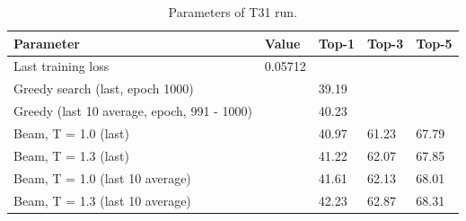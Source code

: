 \documentclass{article}
\begin{document}
\begin{table}[h!]
\caption{Parameters of T31 run.}
  \centering
  \begin{tabular}{p{8.2cm}p{1.5cm}p{1.5cm}p{1.5cm}p{1.5cm}}
    \toprule
    Parameter & Value & Top-1 & Top-3 & Top-5 \\
    \midrule
    Last training loss & 0.05712 & & & \\
    \midrule
    Greedy search (last, epoch 1000) & & 39.19 & & \\
    Greedy (last 10 average, epoch, 991 - 1000) & & 40.23 & & \\
    \midrule
    Beam, T = 1.0 (last) & & 40.97 & 61.23 & 67.79  \\
    Beam, T = 1.3 (last) & & 41.22 & 62.07 & 67.85 \\ 
    \midrule
    Beam, T = 1.0 (last 10 average) & & 41.61 & 62.13 &  68.01 \\
    Beam, T = 1.3 (last 10 average) & & 42.23 & 62.87 & 68.31 \\ 
    \bottomrule
  \end{tabular}
  \label{tbl:t11}

\end{table} 
\end{document}
